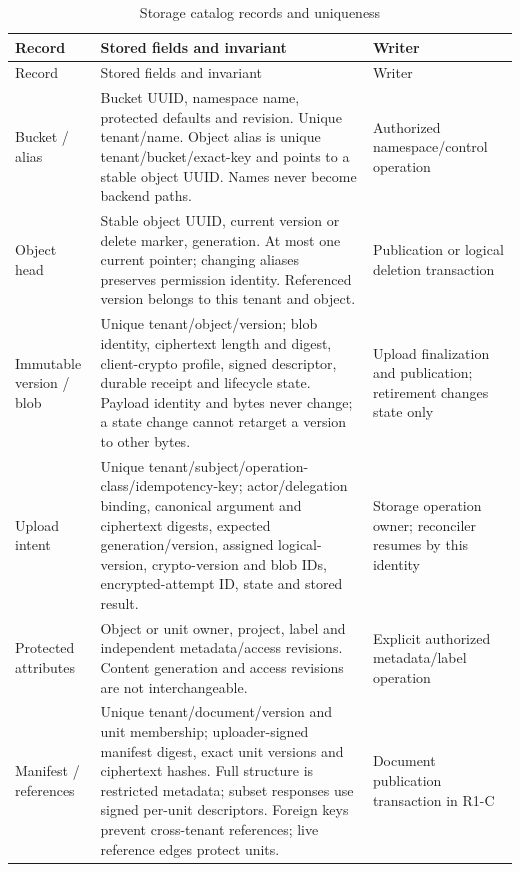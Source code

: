 \documentclass[11pt,a4paper]{article}
\begin{document}
\begin{longtable}{@{}P{0.19\textwidth}P{0.43\textwidth}P{0.26\textwidth}@{}}
\caption{Storage catalog records and uniqueness}\label{tab:storagecatalog}\\
\toprule Record & Stored fields and invariant & Writer\\\midrule\endfirsthead
\toprule Record & Stored fields and invariant & Writer\\\midrule\endhead
Bucket / alias & Bucket UUID, namespace name, protected defaults and revision. Unique tenant/name. Object alias is unique tenant/bucket/exact-key and points to a stable object UUID. Names never become backend paths. & Authorized namespace/control operation\\
Object head & Stable object UUID, current version or delete marker, generation. At most one current pointer; changing aliases preserves permission identity. Referenced version belongs to this tenant and object. & Publication or logical deletion transaction\\
Immutable version / blob & Unique tenant/object/version; blob identity, ciphertext length and digest, client-crypto profile, signed descriptor, durable receipt and lifecycle state. Payload identity and bytes never change; a state change cannot retarget a version to other bytes. & Upload finalization and publication; retirement changes state only\\
Upload intent & Unique tenant/subject/operation-class/idempotency-key; actor/delegation binding, canonical argument and ciphertext digests, expected generation/version, assigned logical-version, crypto-version and blob IDs, encrypted-attempt ID, state and stored result. & Storage operation owner; reconciler resumes by this identity\\
Protected attributes & Object or unit owner, project, label and independent metadata/access revisions. Content generation and access revisions are not interchangeable. & Explicit authorized metadata/label operation\\
Manifest / references & Unique tenant/document/version and unit membership; uploader-signed manifest digest, exact unit versions and ciphertext hashes. Full structure is restricted metadata; subset responses use signed per-unit descriptors. Foreign keys prevent cross-tenant references; live reference edges protect units. & Document publication transaction in R1-C\\
\bottomrule
\end{longtable}
\end{document}
